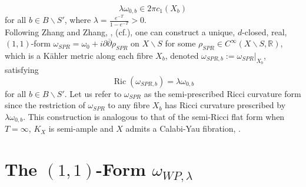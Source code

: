 \documentclass[12pt]{article}
\numberwithin{equation}{section}
\newcommand{\R}{\mathbb{R}}
\renewcommand{\d}{\partial}
\newcommand{\dbar}{\overline{\partial}}
\DeclareMathOperator{\Ric}{Ric}
\begin{document}
\begin{equation*}
    \lambda \omega_{0,b} \in 2\pi c_1(X_b)
\end{equation*}
for all $b \in B\backslash S'$, where $\lambda = \frac{e^{-T}}{1-e^{-T}} > 0$.\\
Following Zhang and Zhang, \cite{ZZ20}, (cf.\cite{Y78}),  one can construct a unique, $d$-closed, real, $(1,1)$-form $\omega_{SPR} = \omega_0 + i\d\dbar \rho_{SPR}$ on $X\backslash S$ for some $\rho_{SPR} \in C^\infty(X\backslash S, \R)$, which is a K\"ahler metric along each fibre $X_b$, denoted $\omega_{SPR,b}:= \omega_{SPR}|_{X_b}$, satisfying
\begin{equation*}
    \Ric(\omega_{SPR,b}) = \lambda\omega_{0,b}
\end{equation*}
for all $b \in B\backslash S'$. Let us refer to $\omega_{SPR}$ as the semi-prescribed Ricci curvature form since the restriction of $\omega_{SPR}$ to any fibre $X_b$ has Ricci curvature prescribed by $\lambda\omega_{0,b}$. This construction is analogous to that of the semi-Ricci flat form when $T = \infty$, $K_X$ is semi-ample and $X$ admits a Calabi-Yau fibration, \cite{ST07}.

\section{The $(1,1)$-Form $\omega_{WP,\lambda}$}
\end{document}
